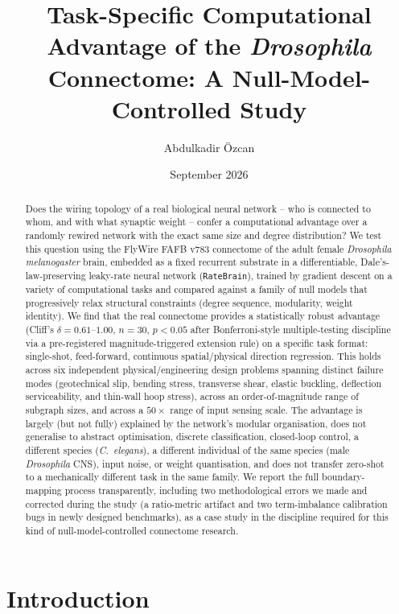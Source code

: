 \documentclass[11pt]{article}
\title{Task-Specific Computational Advantage of the \emph{Drosophila}
Connectome: A Null-Model-Controlled Study}
\author[1]{Abdulkadir Özcan}
\affil[1]{Independent Researcher \\ \texttt{a.kadir.ozcan@icloud.com}}
\date{September 2026}
\begin{document}
\maketitle

\begin{abstract}
Does the wiring topology of a real biological neural network -- who is
connected to whom, and with what synaptic weight -- confer a
computational advantage over a randomly rewired network with the exact
same size and degree distribution? We test this question using the
FlyWire FAFB v783 connectome of the adult female \emph{Drosophila
melanogaster} brain, embedded as a fixed recurrent substrate in a
differentiable, Dale's-law-preserving leaky-rate neural network
(\texttt{RateBrain}), trained by gradient descent on a variety of
computational tasks and compared against a family of null models that
progressively relax structural constraints (degree sequence, modularity,
weight identity). We find that the real connectome provides a
statistically robust advantage (Cliff's $\delta = 0.61$--$1.00$, $n=30$,
$p < 0.05$ after Bonferroni-style multiple-testing discipline via a
pre-registered magnitude-triggered extension rule) on a specific task
format: single-shot, feed-forward, continuous spatial/physical direction
regression. This holds across six independent physical/engineering
design problems spanning distinct failure modes (geotechnical slip,
bending stress, transverse shear, elastic buckling, deflection
serviceability, and thin-wall hoop stress), across an order-of-magnitude
range of subgraph sizes, and across a $50\times$ range of input sensing
scale. The advantage is largely (but not fully) explained by the
network's modular organisation, does not generalise to abstract
optimisation, discrete classification, closed-loop control, a different
species (\emph{C.~elegans}), a different individual of the same species
(male \emph{Drosophila} CNS), input noise, or weight quantisation, and
does not transfer zero-shot to a mechanically different task in the same
family. We report the full boundary-mapping process transparently,
including two methodological errors we made and corrected during the
study (a ratio-metric artifact and two term-imbalance calibration bugs
in newly designed benchmarks), as a case study in the discipline required
for this kind of null-model-controlled connectome research.
\end{abstract}

\section{Introduction}
\end{document}
